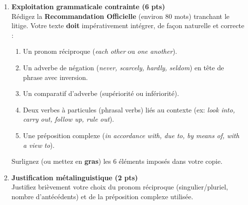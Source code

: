 \documentclass[11pt]{article}
\begin{document}
\begin{exercice}
\begin{enumerate}
    \item \textbf{Exploitation grammaticale contrainte (6 pts)} \\
    Rédigez la \textbf{Recommandation Officielle} (environ 80 mots) tranchant le litige. Votre texte \textbf{doit} impérativement intégrer, de façon naturelle et correcte :
    \begin{enumerate}
        \item Un pronom réciproque (\textit{each other} ou \textit{one another}).
        \item Un adverbe de négation (\textit{never, scarcely, hardly, seldom}) en tête de phrase avec inversion.
        \item Un comparatif d'adverbe (supériorité ou infériorité).
        \item Deux verbes à particules (phrasal verbs) liés au contexte (ex: \textit{look into, carry out, follow up, rule out}).
        \item Une préposition complexe (\textit{in accordance with, due to, by means of, with a view to}).
    \end{enumerate}
    Surlignez (ou mettez en \textbf{gras}) les 6 éléments imposés dans votre copie.

    \item \textbf{Justification métalinguistique (2 pts)} \\
    Justifiez brièvement votre choix du pronom réciproque (singulier/pluriel, nombre d'antécédents) et de la préposition complexe utilisée.
\end{enumerate}
\end{exercice}
\end{document}
